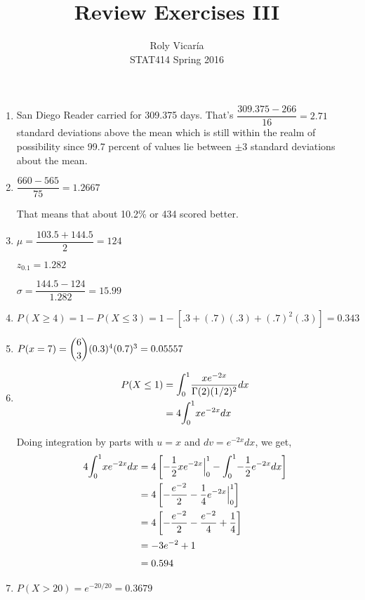 \documentclass{article}
\title{Review Exercises III}
\author{Roly Vicar\'ia \\ STAT414 Spring 2016}
\newcommand\lint{\mathlarger{\int}}
\begin{document}
    
    \maketitle
    \begin{enumerate}
     \item 
      San Diego Reader carried for 309.375 days. That's $\dfrac{309.375 - 266}{16} = 2.71$ standard
      deviations above the mean which is still within the realm of possibility since 99.7 percent
      of values lie between $\pm$3 standard deviations about the mean.
     
     \item
      $\dfrac{660-565}{75} = 1.2667$
      
      That means that about 10.2\% or 434 scored better.
     
     \item
      $\mu = \dfrac{103.5 + 144.5}{2} = 124$
      
      $z_{0.1} = 1.282$
      
      $\sigma = \dfrac{144.5-124}{1.282} = 15.99$
     
     \item
      $P(X \ge 4) = 1 - P(X \le 3) = 1 - [.3 + (.7)(.3) + (.7)^2(.3)] = 0.343$
     
     \item
      $P(x = 7) = \dbinom{6}{3}(0.3)^4(0.7)^3 = 0.05557$
     
     \item
      \begin{align*}
	P(X \le 1) &= \lint_0^1 {\dfrac{xe^{-2x}}{\Gamma(2)(1/2)^2}dx} \\
	  &= 4 \lint_0^1 {xe^{-2x}dx}
      \end{align*}
      
      Doing integration by parts with $u = x$ and $dv = e^{-2x}dx$, we get,
      \begin{align*}
       4 \lint_0^1 {xe^{-2x}dx} &= 4\left[-\dfrac{1}{2}xe^{-2x}\Big|_0^1 - \lint_0^1 {-\dfrac{1}{2}e^{-2x}dx}\right] \\
	&= 4 \left[ -\dfrac{e^{-2}}{2} - \dfrac{1}{4}e^{-2x}\Big|_0^1 \right] \\
	&= 4 \left[ -\dfrac{e^{-2}}{2} - \dfrac{e^{-2}}{4} + \dfrac{1}{4} \right] \\
	&= -3e^{-2} + 1 \\
	&= 0.594
      \end{align*}
     
     \item
      $P(X > 20) = e^{-20/20} = 0.3679$
     

\end{enumerate}
\end{document}
